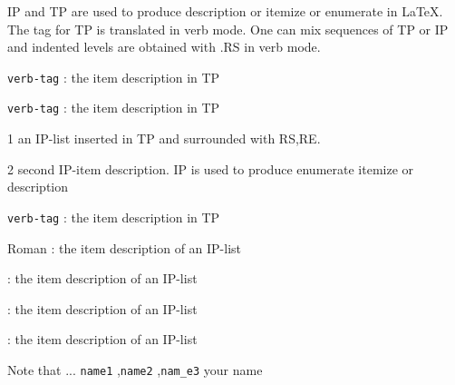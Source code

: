 IP and TP are used to produce description or itemize or enumerate in
 \LaTeX.
The  tag for TP is translated in verb mode. One can mix sequences 
of TP or IP and indented levels are obtained with .RS 
in verb mode.
\begin{scitem}
\item[{\tt verb-tag}]
: the item description in TP
\item[{\tt verb-tag}]
: the item description in TP
\begin{scitem}
\begin{scitem}
\item[{1}]
an IP-list inserted in TP and surrounded with RS,RE.
\item[{2}]
second IP-item description. IP is used to produce enumerate itemize or 
description
\end{scitem}
\end{scitem}%
\item[{\tt verb-tag}]
: the item description in TP
\end{scitem}%
\par\noindent
\begin{scitem}
\item[{Roman}]
: the item description of an IP-list 
\item[{%
\it Italic}]
: the item description of an IP-list 
\item[{%
\bf Bod}]
: the item description of an IP-list 
\item[{%
\tt Verb}]
: the item description of an IP-list 
\end{scitem}\par\noindent
{}
Note that ...
{\verb?name1?} \pageref{name1},{\verb?name2?} \pageref{name2},{\verb?nam_e3?} \pageref{name3}
your name

